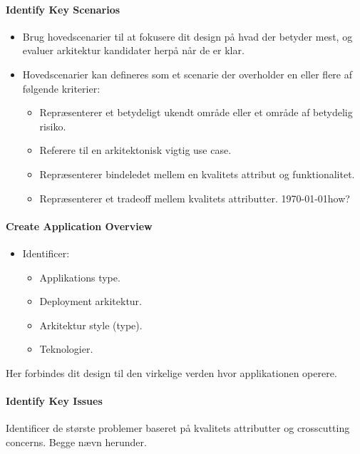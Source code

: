 \paragraph{Identify Key Scenarios}
\begin{itemize}
	\item Brug hovedscenarier til at fokusere dit design på hvad der betyder mest, og evaluer arkitektur kandidater herpå når de er klar.
	\item Hovedscenarier kan defineres som et scenarie der overholder en eller flere af følgende kriterier:
	\begin{itemize}
		\item Repræsenterer et betydeligt ukendt område eller et område af betydelig risiko.
		\item Referere til en arkitektonisk vigtig use case.
		\item Repræsenterer bindeledet mellem en kvalitets attribut og funktionalitet.
		\item Repræsenterer et tradeoff mellem kvalitets attributter. \today{how?}
	\end{itemize}
\end{itemize}

\paragraph{Create Application Overview}
\begin{itemize}
	\item Identificer:
	\begin{itemize}
		\item Applikations type.
		\item Deployment arkitektur. 
		\item Arkitektur style (type). 
		\item Teknologier. 
	\end{itemize}
\end{itemize}

Her forbindes dit design til den virkelige verden hvor applikationen operere. 

\paragraph{Identify Key Issues}
Identificer de største problemer baseret på kvalitets attributter og crosscutting concerns. Begge nævn herunder.

